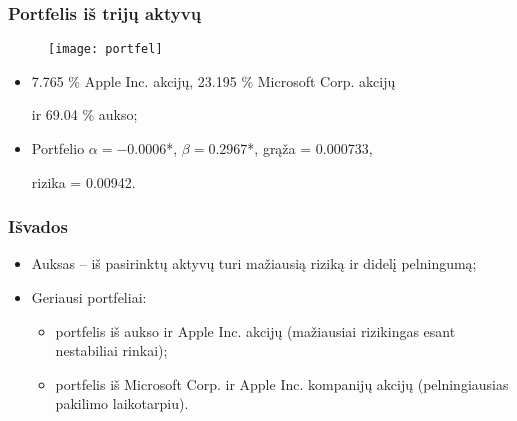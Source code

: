 \documentclass[utf8,hyperref={unicode},xcolor=dvipsnames]{beamer}
\theoremstyle{change}\newtheorem{teorema}{Teiginys}
\theoremstyle{change}\newtheorem{salyga}{}
\newcommand{\HH}{\mathrm{H}} %
\newcommand{\Hao}{\HH_{\alpha}^o}
\begin{document}
\begin{frame}
    \frametitle{Portfelis iš trijų aktyvų}
\begin{figure}
\centering
\texttt{[image: portfel]}

\end{figure}

    \begin{itemize}
	\item 7.765 $\%$ Apple Inc. akcijų, 23.195 $\%$ Microsoft Corp. akcijų

 ir 69.04 $\%$ aukso;
	\item Portfelio $\alpha = - 0.0006$*, $\beta= 0.2967$*, grąža = 0.000733, 

rizika = 0.00942.
    \end{itemize}
\end{frame}

\begin{frame}
    \frametitle{Išvados} 

    \begin{itemize}
\item Auksas -- iš pasirinktų aktyvų turi mažiausią riziką ir didelį pelningumą;

\item Geriausi portfeliai: 
\begin{itemize}
	\item portfelis iš aukso ir Apple Inc. akcijų (mažiausiai rizikingas esant nestabiliai rinkai);
	\item portfelis iš Microsoft Corp. ir Apple Inc. kompanijų akcijų (pelningiausias pakilimo laikotarpiu).
\end{itemize}
    \end{itemize}

\end{frame}



 
\end{document}
